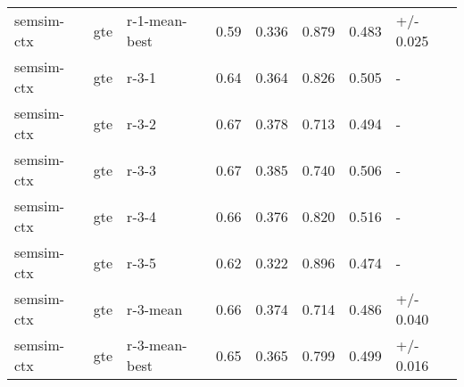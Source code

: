 \begin{tabular}{llllll}
semsim-ctx & gte & r-1-mean-best & 0.59 & 0.336 & 0.879 & 0.483 & +/- 0.025 \\
semsim-ctx & gte & r-3-1 & 0.64 & 0.364 & 0.826 & 0.505 & - \\
semsim-ctx & gte & r-3-2 & 0.67 & 0.378 & 0.713 & 0.494 & - \\
semsim-ctx & gte & r-3-3 & 0.67 & 0.385 & 0.740 & 0.506 & - \\
semsim-ctx & gte & r-3-4 & 0.66 & 0.376 & 0.820 & 0.516 & - \\
semsim-ctx & gte & r-3-5 & 0.62 & 0.322 & 0.896 & 0.474 & - \\
semsim-ctx & gte & r-3-mean & 0.66 & 0.374 & 0.714 & 0.486 & +/- 0.040 \\
semsim-ctx & gte & r-3-mean-best & 0.65 & 0.365 & 0.799 & 0.499 & +/- 0.016 \\
\bottomrule
\end{tabular}
